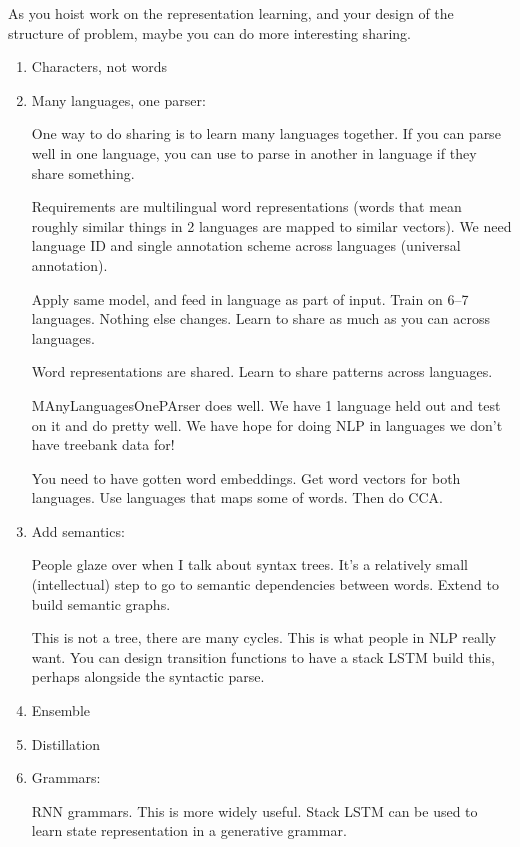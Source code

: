 As you hoist work on the representation learning, and your design of the structure of problem, maybe you can do more interesting sharing. 
\begin{enumerate}
\item
Characters, not words
\item
Many languages, one parser: 

One way to do sharing is to learn many languages together. If you can parse well in one language, you can use to parse in another in language if they share something.

Requirements are multilingual word representations (words that mean roughly similar things in 2 languages are mapped to similar vectors). We need language ID and single annotation scheme across languages (universal annotation). 

Apply same model, and feed in language as part of input. Train on 6--7 languages. Nothing else changes. Learn to share as much as you can across languages. 

Word representations are shared. Learn to share patterns across languages.

MAnyLanguagesOnePArser does well. We have 1 language held out and test on it and do pretty well. We have hope for doing NLP in languages we don't have treebank data for!

You need to have gotten word embeddings. Get word vectors for both languages. Use languages that maps some of words. Then do CCA. %
\item
Add semantics: 

People glaze over when I talk about syntax trees. It's a relatively small (intellectual) step to go to semantic dependencies between words. Extend to build semantic graphs. 

This is not a tree, there are many cycles. This is what people in NLP really want. You can design transition functions to have a stack LSTM build this, perhaps alongside the syntactic parse.

\item
Ensemble
\item
Distillation
\item
Grammars:

RNN grammars. This is more widely useful. Stack LSTM can be used to learn state representation in a generative grammar. %


\end{enumerate}
